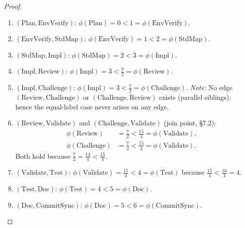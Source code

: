 \documentclass[12pt]{article}
\theoremstyle{definition}
\begin{document}
\begin{proof}
\begin{enumerate}
  \item $(\mathrm{Plan},\mathrm{EnvVerify})$:
        $\phi(\mathrm{Plan}) = 0 < 1 = \phi(\mathrm{EnvVerify})$. \checkmark

  \item $(\mathrm{EnvVerify},\mathrm{StdMap})$:
        $\phi(\mathrm{EnvVerify}) = 1 < 2 = \phi(\mathrm{StdMap})$.
        \checkmark

  \item $(\mathrm{StdMap},\mathrm{Impl})$:
        $\phi(\mathrm{StdMap}) = 2 < 3 = \phi(\mathrm{Impl})$. \checkmark

  \item $(\mathrm{Impl},\mathrm{Review})$:
        $\phi(\mathrm{Impl}) = 3 < \tfrac{7}{2} = \phi(\mathrm{Review})$.
        \checkmark

  \item $(\mathrm{Impl},\mathrm{Challenge})$:
        $\phi(\mathrm{Impl}) = 3 < \tfrac{7}{2} = \phi(\mathrm{Challenge})$.
        \checkmark
        \newline
        \emph{Note:} No edge $(\mathrm{Review},\mathrm{Challenge})$ or
        $(\mathrm{Challenge},\mathrm{Review})$ exists (parallel siblings);
        hence the equal-label case never arises on any edge.

  \item $(\mathrm{Review},\mathrm{Validate})$ and
        $(\mathrm{Challenge},\mathrm{Validate})$ (join point, \S7.2):
        \begin{align}
          \phi(\mathrm{Review})    &= \tfrac{7}{2} < \tfrac{15}{4}
            = \phi(\mathrm{Validate}), \label{eq:ev-rev-val}\\
          \phi(\mathrm{Challenge}) &= \tfrac{7}{2} < \tfrac{15}{4}
            = \phi(\mathrm{Validate}). \label{eq:ev-chal-val}
        \end{align}
        Both hold because
        $\tfrac{7}{2} = \tfrac{14}{4} < \tfrac{15}{4}$. \checkmark

  \item $(\mathrm{Validate},\mathrm{Test})$:
        $\phi(\mathrm{Validate}) = \tfrac{15}{4} < 4 = \phi(\mathrm{Test})$
        because $\tfrac{15}{4} < \tfrac{16}{4} = 4$. \checkmark

  \item $(\mathrm{Test},\mathrm{Doc})$:
        $\phi(\mathrm{Test}) = 4 < 5 = \phi(\mathrm{Doc})$. \checkmark

  \item $(\mathrm{Doc},\mathrm{CommitSync})$:
        $\phi(\mathrm{Doc}) = 5 < 6 = \phi(\mathrm{CommitSync})$.
        \checkmark


\end{enumerate}
\end{proof}
\end{document}
